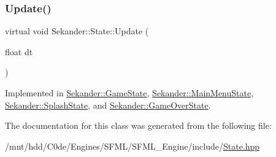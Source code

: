 \subsubsection{\texorpdfstring{Update()}{Update()}}
{\footnotesize\ttfamily virtual void Sekander\+::\+State\+::\+Update (\begin{DoxyParamCaption}\item[{float}]{dt }\end{DoxyParamCaption})\hspace{0.3cm}{\ttfamily [pure virtual]}}



Implemented in \hyperlink{classSekander_1_1GameState_ac04d512257bd38244f2d6d1484aa9040}{Sekander\+::\+Game\+State}, \hyperlink{classSekander_1_1MainMenuState_aabbfda236df88eee953e3b88ca8e7631}{Sekander\+::\+Main\+Menu\+State}, \hyperlink{classSekander_1_1SplashState_ac7121b90b97b7d9cdb5774bdc0c6cc2d}{Sekander\+::\+Splash\+State}, and \hyperlink{classSekander_1_1GameOverState_a00b3dcb61cb0342cf0fe4cc181e99b6b}{Sekander\+::\+Game\+Over\+State}.



The documentation for this class was generated from the following file\+:\begin{DoxyCompactItemize}
\item 
/mnt/hdd/\+C0de/\+Engines/\+S\+F\+M\+L/\+S\+F\+M\+L\+\_\+\+Engine/include/\hyperlink{State_8hpp}{State.\+hpp}\end{DoxyCompactItemize}
